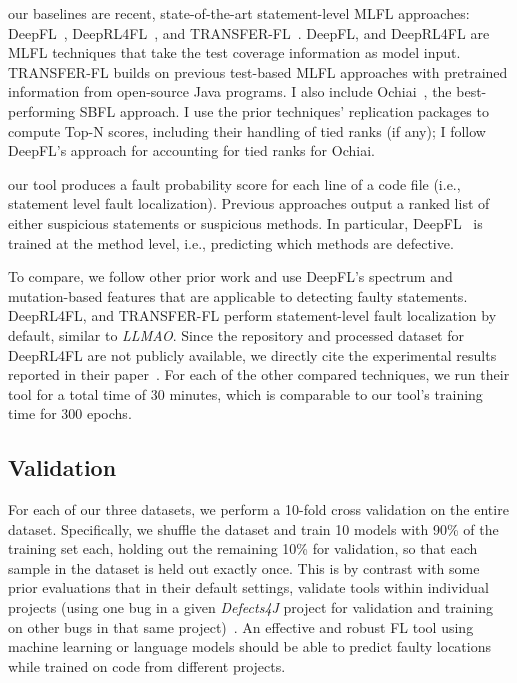 \documentclass[12pt,openany,oneside,table]{cmuthesis}
\begin{document}
    our baselines are recent, state-of-the-art statement-level MLFL approaches: DeepFL~\cite{li2019deepfl}, DeepRL4FL~\cite{li2021fault}, and TRANSFER-FL~\cite{meng2022improving}. DeepFL, and DeepRL4FL are MLFL techniques that take the test coverage information as model input. TRANSFER-FL builds on previous test-based MLFL approaches with pretrained information from open-source Java programs. 
    I also include Ochiai~\cite{abreu2006evaluation}, the best-performing SBFL approach.  I use the prior techniques' replication packages to compute Top-N scores, including their handling of tied ranks (if any); I follow DeepFL's approach for accounting for tied ranks for Ochiai.  
    
    our tool produces a fault probability score for each line of a code file (i.e., statement level fault localization). Previous approaches output a ranked list of either suspicious statements or suspicious methods. In particular, DeepFL~\cite{li2019deepfl} is trained at the method level, i.e., predicting which methods are defective. 
    
    To compare, we follow other prior work and use DeepFL’s spectrum and mutation-based features that are applicable to detecting faulty statements.  DeepRL4FL, and TRANSFER-FL perform statement-level fault localization by default, similar to \textit{LLMAO}.
    Since the repository and processed dataset for DeepRL4FL are not publicly available, we directly cite the experimental results reported in their paper~\cite{li2021fault}. For each of the other compared techniques, we run their tool for a total time of 30 minutes, which is comparable to our tool's training time for 300 epochs.
    
    \subsection{Validation}
    For each of our three datasets, we perform a 10-fold cross validation on the entire dataset. Specifically, we shuffle the dataset and train 10 models with 90\% of the training set each, holding out the remaining 10\% for validation, so that each sample in the dataset is held out exactly once.
    This is by contrast with some prior evaluations that in their default settings, validate tools within individual projects (using one bug in a given \textit{Defects4J} project for validation and training on other bugs in that same project)~\cite{li2019deepfl,lou2021boosting, li2021fault, meng2022improving}.
    An effective and robust FL tool using machine learning or language models should be able to predict faulty locations while trained on code from different projects. 
    
\end{document}
